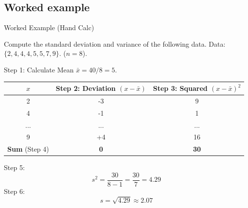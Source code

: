 \subsection{Worked example}
\begin{frame}[allowframebreaks]{Worked Example (Hand Calc)}
\begin{example}
Compute the standard deviation and variance of the following data.
    Data: $\{ 2, 4, 4, 4, 5, 5, 7, 9 \}$. ($n=8$).
    \end{example}
   \pause
   \begin{solution}
  
    Step 1: Calculate Mean $\bar{x} = 40 / 8 = 5$.
    
    \begin{table}[h]
        \centering
        \begin{tabular}{ccc}
            \toprule
            $x$ & Step 2: Deviation $(x-\bar{x})$  & Step  3: Squared $(x-\bar{x})^2$ \\
            \midrule
            2 & -3 & 9 \\
            4 & -1 & 1 \\
            ... & ... & ... \\
            9 & +4 & 16 \\
            \midrule
            \textbf{Sum} (Step 4)& \textbf{0} & \textbf{30} \\
            \bottomrule
        \end{tabular}
      
    \end{table}
Step 5: 
    \[ s^2 = \frac{30}{8-1} = \frac{30}{7} = 4.29 \]
Step 6:
    \[ s = \sqrt{4.29} \approx 2.07 \]
    \end{solution}
\end{frame}


